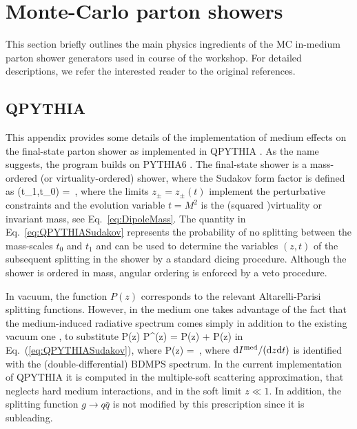 
\section{Monte-Carlo parton showers}
\label{app:models}

This section briefly outlines the main physics ingredients of the MC in-medium parton shower generators used in course of the workshop. For detailed descriptions, we refer the interested reader to the original references.

\subsection{QPYTHIA}
\label{app:qpythia}

This appendix provides some details of the implementation of medium effects on the final-state parton shower as implemented in QPYTHIA \cite{Armesto:2009fj}. As the name suggests, the program builds on PYTHIA6 \cite{Sjostrand:2007gs,Sjostrand:2008vc}. The final-state shower is a mass-ordered (or virtuality-ordered) shower, where the Sudakov form factor is defined as
\beq
\label{eq:QPYTHIASudakov}
\Delta(t_1,t_0) = \exp{} \,,
\eeq
where the limits $z_\pm = z_\pm(t)$ implement the perturbative constraints and the evolution variable $t = M^2$ is the (squared )virtuality or invariant mass, see Eq.~\eqref{eq:DipoleMass}. The quantity in Eq.~\eqref{eq:QPYTHIASudakov} represents the probability of no splitting between the mass-scales $t_0$ and $t_1$ and can be used to determine the variables $(z,t)$ of the subsequent splitting in the shower by a standard dicing procedure. Although the shower is ordered in mass, angular ordering is enforced by a veto procedure.

In vacuum, the function $P(z)$ corresponds to the relevant Altarelli-Parisi splitting functions. However, in the medium one takes advantage of the fact that the medium-induced radiative spectrum comes simply in addition to the existing vacuum one \cite{Wang:2001ifa,Polosa:2006hb}, to substitute
\beq
P(z) \to P^\tot(z) = P(z) + \Delta P(z)
\eeq
in Eq.~(\ref{eq:QPYTHIASudakov}), where 
\beq
\Delta P(z) =   \,,
\eeq
where $\text{d} I^{\text{med}} /(\text{d} z \text{d} t)$ is identified with the (double-differential) BDMPS spectrum. In the current implementation of QPYTHIA it is computed in the multiple-soft scattering approximation, that neglects hard medium interactions, and in the soft limit $z \ll 1$. In addition, the splitting function $g \to q\bar q$ is not modified by this prescription since it is subleading.

